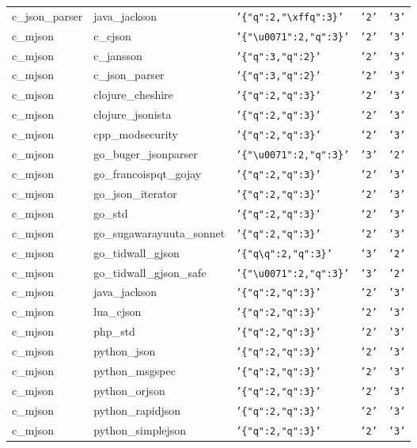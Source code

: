\documentclass[english, 12pt, a4paper, sci, utf8, a-2b, online]{aaltothesis}
\def\str#1{\texttt{'#1'}}
\begin{document}
\begin{longtable}{lllll}
    c\_json\_parser & java\_jackson & \str{\{"q":2,"\textbackslash xffq":3\}} & \str{2} & \str{3} \\
    c\_mjson & c\_cjson & \str{\{"\textbackslash u0071":2,"q":3\}} & \str{2} & \str{3} \\
    c\_mjson & c\_jansson & \str{\{"q":3,"q":2\}} & \str{2} & \str{3} \\
    c\_mjson & c\_json\_parser & \str{\{"q":3,"q":2\}} & \str{2} & \str{3} \\
    c\_mjson & clojure\_cheshire & \str{\{"q":2,"q":3\}} & \str{2} & \str{3} \\
    c\_mjson & clojure\_jsonista & \str{\{"q":2,"q":3\}} & \str{2} & \str{3} \\
    c\_mjson & cpp\_modsecurity & \str{\{"q":2,"q":3\}} & \str{2} & \str{3} \\
    c\_mjson & go\_buger\_jsonparser & \str{\{"\textbackslash u0071":2,"q":3\}} & \str{3} & \str{2} \\
    c\_mjson & go\_francoispqt\_gojay & \str{\{"q":2,"q":3\}} & \str{2} & \str{3} \\
    c\_mjson & go\_json\_iterator & \str{\{"q":2,"q":3\}} & \str{2} & \str{3} \\
    c\_mjson & go\_std & \str{\{"q":2,"q":3\}} & \str{2} & \str{3} \\
    c\_mjson & go\_sugawarayuuta\_sonnet & \str{\{"q":2,"q":3\}} & \str{2} & \str{3} \\
    c\_mjson & go\_tidwall\_gjson & \str{\{"q\textbackslash q":2,"q":3\}} & \str{3} & \str{2} \\
    c\_mjson & go\_tidwall\_gjson\_safe & \str{\{"\textbackslash u0071":2,"q":3\}} & \str{3} & \str{2} \\
    c\_mjson & java\_jackson & \str{\{"q":2,"q":3\}} & \str{2} & \str{3} \\
    c\_mjson & lua\_cjson & \str{\{"q":2,"q":3\}} & \str{2} & \str{3} \\
    c\_mjson & php\_std & \str{\{"q":2,"q":3\}} & \str{2} & \str{3} \\
    c\_mjson & python\_json & \str{\{"q":2,"q":3\}} & \str{2} & \str{3} \\
    c\_mjson & python\_msgspec & \str{\{"q":2,"q":3\}} & \str{2} & \str{3} \\
    c\_mjson & python\_orjson & \str{\{"q":2,"q":3\}} & \str{2} & \str{3} \\
    c\_mjson & python\_rapidjson & \str{\{"q":2,"q":3\}} & \str{2} & \str{3} \\
    c\_mjson & python\_simplejson & \str{\{"q":2,"q":3\}} & \str{2} & \str{3} \\

\end{longtable}
\end{document}
